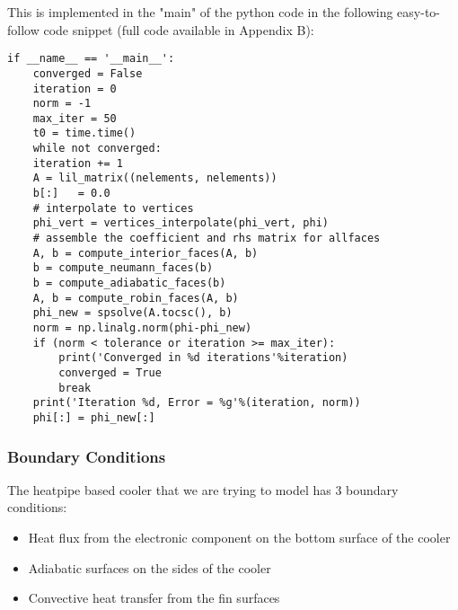 \documentclass[11pt]{article}
\begin{document}
This is implemented in the "main" of the python code in the following easy-to-follow code snippet (full code available in Appendix B):
\begin{verbatim}
if __name__ == '__main__':
    converged = False
    iteration = 0
    norm = -1
    max_iter = 50
    t0 = time.time()
    while not converged:
	iteration += 1
	A = lil_matrix((nelements, nelements))
	b[:]   = 0.0
	# interpolate to vertices
	phi_vert = vertices_interpolate(phi_vert, phi)  
	# assemble the coefficient and rhs matrix for allfaces
	A, b = compute_interior_faces(A, b)
	b = compute_neumann_faces(b)
	b = compute_adiabatic_faces(b)
	A, b = compute_robin_faces(A, b)
	phi_new = spsolve(A.tocsc(), b)
	norm = np.linalg.norm(phi-phi_new)
	if (norm < tolerance or iteration >= max_iter):
	    print('Converged in %d iterations'%iteration)
	    converged = True
	    break
	print('Iteration %d, Error = %g'%(iteration, norm))
	phi[:] = phi_new[:]
\end{verbatim}

\subsubsection{Boundary Conditions}
\label{sec:org2f7883c}
The heatpipe based cooler that we are trying to model has 3 boundary conditions:
\begin{itemize}
\item Heat flux from the electronic component on the bottom surface of the cooler
\item Adiabatic surfaces on the sides of the cooler
\item Convective heat transfer from the fin surfaces
\end{itemize}
\end{document}
